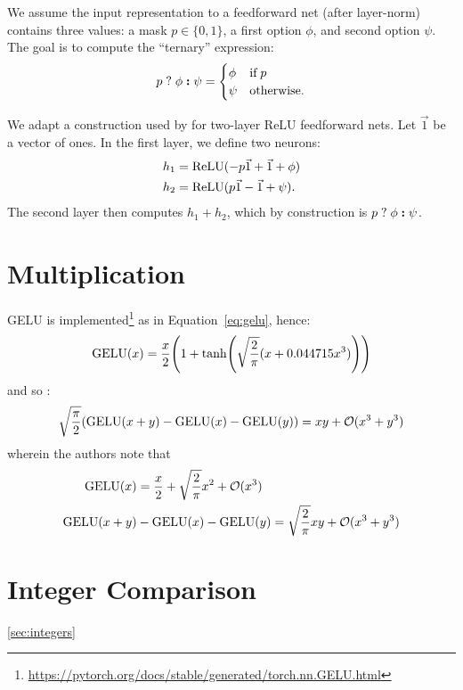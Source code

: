     We assume the input representation to a feedforward net (after layer-norm) contains three values: a mask $p \in \{0, 1\}$, a first option $\phi$, and second option $\psi$. The goal is to compute the ``ternary'' expression:
    \begin{equation*}
        p\;\mathbf{?}\; \phi\; \textbf{:} \;\psi =
        \begin{cases}
            \phi & \textrm{if} \; p \\
            \psi & \textrm{otherwise.}
        \end{cases}
    \end{equation*}

    We adapt a construction used by \citet[Theorem 1]{merrill-sabharwal-2024-cot} for two-layer ReLU feedforward nets.
    Let $\vec 1$ be a vector of ones.
    In the first layer, we define two neurons:
    \begin{align*}
        h_1 &= \text{ReLU}(-p \vec 1 + \vec 1 + \phi) \\
        h_2 &= \text{ReLU}(p \vec 1 - \vec 1 + \psi) .
    \end{align*}
    The second layer then computes $h_1 + h_2$, which by construction is $p\;\mathbf{?}\; \phi\; \textbf{:} \;\psi$.

\section{Multiplication}
\label{sec:ffnn_multiplication}

GELU is implemented\footnote{\url{https://pytorch.org/docs/stable/generated/torch.nn.GELU.html}} as in Equation~\eqref{eq:gelu}, hence:
\begin{align*}
    \GELU(x) = \frac{x}{2} \parens*{1 + \tanh\parens*{\sqrt{\frac{2}{\pi}} (x + 0.044715x^3)}}
\end{align*}
and so \citep[Lemma 4]{akyurek2022learning}:
\begin{align*}
    \sqrt{\frac{\pi}{2}}
    (\text{GELU}(x + y) - \text{GELU}(x) - \text{GELU}(y))
    = xy + \mathcal{O}(x^3 + y^3)
\end{align*}
wherein the authors note that
\begin{align*}
    \text{GELU}(x) &= \frac{x}{2} + \sqrt{\frac{2}{\pi}}x^2 + \mathcal{O}(x^3) \\
    \text{GELU}(x + y) &- \text{GELU}(x) - \text{GELU}(y) = \sqrt{\frac{2}{\pi}} xy + \mathcal{O}(x^3 + y^3)
\end{align*}

\section{Integer Comparison}
\cref{sec:integers}